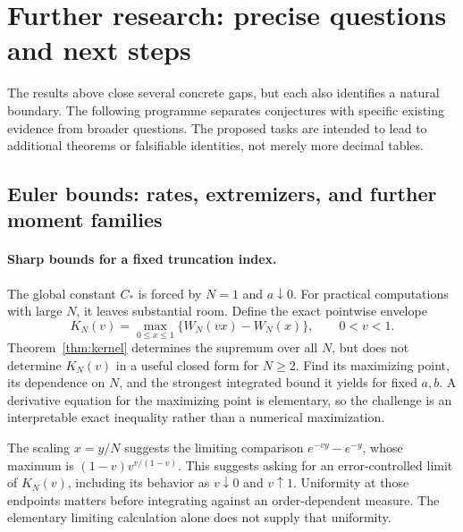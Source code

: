 \section{Further research: precise questions and next steps}
\label{sec:research}

The results above close several concrete gaps, but each also
identifies a natural boundary. The following programme separates
conjectures with specific existing evidence from broader questions.
The proposed tasks are intended to lead to additional theorems
or falsifiable identities, not merely more decimal tables.

\subsection{Euler bounds: rates, extremizers, and further moment families}

\paragraph{Sharp bounds for a fixed truncation index.}
The global constant $C_*$ is forced by $N=1$ and $a\downarrow0$.
For practical computations with large $N$, it leaves substantial
room. Define the exact pointwise envelope
\[
 K_N(v)=\max_{0\leq x\leq1}\{W_N(vx)-W_N(x)\},
 \qquad 0<v<1.
\]
Theorem~\ref{thm:kernel} determines the supremum over all $N$,
but does not determine $K_N(v)$ in a useful closed form for
$N\geq2$. Find its maximizing point, its dependence on $N$,
and the strongest integrated bound it yields for fixed $a,b$.
A derivative equation for the maximizing point is elementary,
so the challenge is an interpretable exact inequality rather
than a numerical maximization.

The scaling $x=y/N$ suggests the limiting comparison
$e^{-vy}-e^{-y}$, whose maximum is
$(1-v)v^{v/(1-v)}$. This suggests asking for an error-controlled
limit of $K_N(v)$, including its behavior as $v\downarrow0$
and $v\uparrow1$. Uniformity at those endpoints matters
before integrating against an order-dependent measure.
The elementary limiting calculation alone does not supply
that uniformity.

